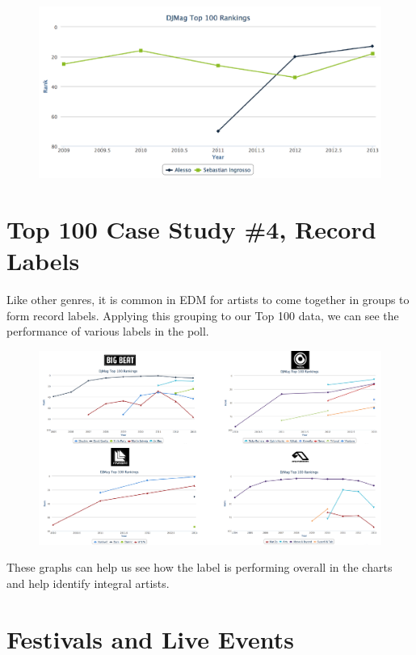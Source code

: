 \documentclass[12pt]{dalcsthesis}
\begin{document}
\begin{figure}[h]
\includegraphics[scale=.65]{alesso_seb_graph}
\centering
\end{figure}

\section{Top 100 Case Study \#4, Record Labels}

Like other genres, it is common in EDM for artists to come together in groups to form record labels. Applying this grouping to our Top 100 data, we can see the performance of various labels in the poll. \newpage

\begin{figure}[h]
\includegraphics[scale=.45]{label_graph}
\centering
\end{figure}

These graphs can help us see how the label is performing overall in the charts and help identify integral artists. 

\section{Festivals and Live Events}
\end{document}

